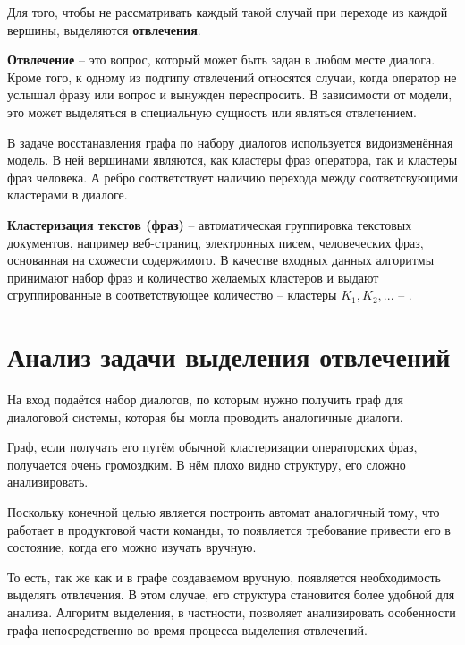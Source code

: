 \documentclass[times,specification,annotation]{itmo-student-thesis}
\begin{document}
	Для того, чтобы не рассматривать каждый такой случай при переходе из каждой вершины, выделяются \textbf{отвлечения}.
	
	\textbf{Отвлечение} -- это вопрос, который может быть задан в любом месте диалога. Кроме того, к одному из подтипу отвлечений относятся случаи, когда оператор не услышал фразу или вопрос и вынужден переспросить. В зависимости от модели, это может выделяться в специальную сущность или являться отвлечением.
	
	В задаче восстанавления графа по набору диалогов используется видоизменённая модель. В ней вершинами являются, как кластеры фраз оператора, так и кластеры фраз человека. А ребро соответствует наличию перехода между соответсвующими кластерами в диалоге.
	
	\textbf{Кластеризация текстов (фраз)} -- автоматическая группировка текстовых документов, например веб-страниц, электронных писем, человеческих фраз, основанная на схожести содержимого. В качестве входных данных алгоритмы принимают набор фраз и количество желаемых кластеров и выдают сгруппированные в соответствующее количество -- кластеры $K_1, K_2, ...$ -- \cite{Li2009}.
	
	\section{Анализ задачи выделения отвлечений}%
	На вход подаётся набор диалогов, по которым нужно получить граф для диалоговой системы, которая бы могла проводить аналогичные диалоги.
	
	Граф, если получать его путём обычной кластеризации операторских фраз, получается очень громоздким. В нём плохо видно структуру, его сложно анализировать.
	
	Поскольку конечной целью является построить автомат аналогичный тому, что работает в продуктовой части команды, то появляется требование привести его в состояние, когда его можно изучать вручную. 
	
	То есть, так же как и в графе создаваемом вручную, появляется необходимость выделять отвлечения. В этом случае, его структура становится более удобной для анализа. Алгоритм выделения, в частности, позволяет анализировать особенности графа непосредственно во время процесса выделения отвлечений. 
	
\end{document}
